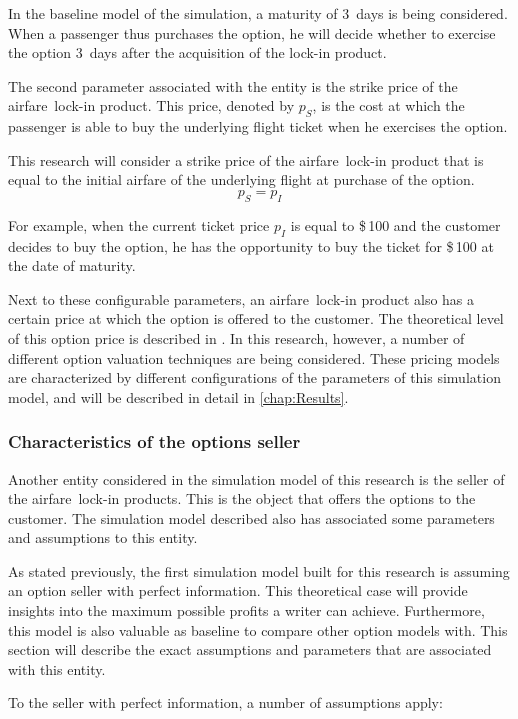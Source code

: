 In the baseline model of the simulation, a maturity of 3~days is being considered. When a passenger thus purchases the option, he will decide whether to exercise the option 3~days after the acquisition of the lock-in product.

The second parameter associated with the entity is the strike price of the airfare~lock-in product. This price, denoted by $p_S$, is the cost at which the passenger is able to buy the underlying flight ticket when he exercises the option.

This research will consider a strike price of the airfare~lock-in product that is equal to the initial airfare of the underlying flight at purchase of the option.
$$p_S = p_I$$

For example, when the current ticket price $p_I$ is equal to \$\,100 and the customer decides to buy the option, he has the opportunity to buy the ticket for \$\,100 at the date of maturity.  

Next to these configurable parameters, an airfare~lock-in product also has a certain price at which the option is offered to the customer. The theoretical level of this option price is described in . In this research, however, a number of different option valuation techniques are being considered. These pricing models are characterized by different configurations of the parameters of this simulation model, and will be described in detail in \autoref{chap:Results}.


\subsubsection{Characteristics of the options seller}
Another entity considered in the simulation model of this research is the seller of the airfare~lock-in products. This is the object that offers the options to the customer. The simulation model described also has associated some parameters and assumptions to this entity.

As stated previously, the first simulation model built for this research is assuming an option seller with perfect information. This theoretical case will provide insights into the maximum possible profits a writer can achieve. Furthermore, this model is also valuable as baseline to compare other option models with. This section will describe the exact assumptions and parameters that are associated with this entity.

To the seller with perfect information, a number of assumptions apply:

